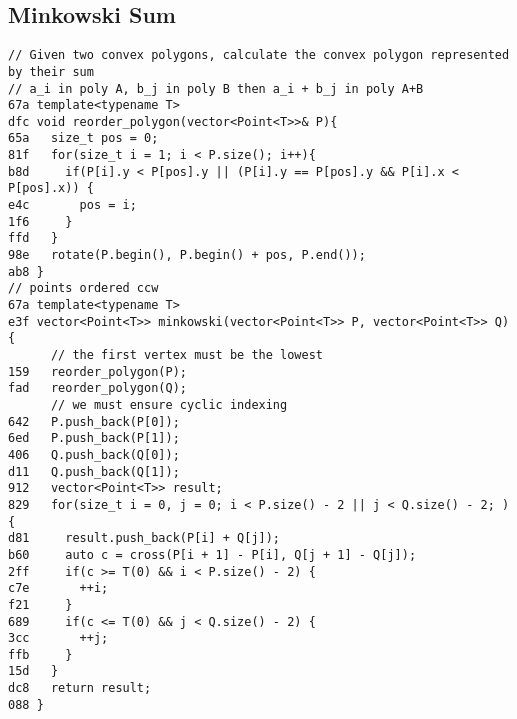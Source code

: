 \documentclass[10pt, a4paper, twoside]{article}
\begin{document}
\subsection{Minkowski Sum}
\begin{lstlisting}
// Given two convex polygons, calculate the convex polygon represented by their sum
// a_i in poly A, b_j in poly B then a_i + b_j in poly A+B
67a template<typename T>
dfc void reorder_polygon(vector<Point<T>>& P){
65a   size_t pos = 0;
81f   for(size_t i = 1; i < P.size(); i++){
b8d     if(P[i].y < P[pos].y || (P[i].y == P[pos].y && P[i].x < P[pos].x)) {
e4c       pos = i;
1f6     }
ffd   }
98e   rotate(P.begin(), P.begin() + pos, P.end());
ab8 }
// points ordered ccw
67a template<typename T>
e3f vector<Point<T>> minkowski(vector<Point<T>> P, vector<Point<T>> Q){
      // the first vertex must be the lowest
159   reorder_polygon(P);
fad   reorder_polygon(Q);
      // we must ensure cyclic indexing
642   P.push_back(P[0]);
6ed   P.push_back(P[1]);
406   Q.push_back(Q[0]);
d11   Q.push_back(Q[1]);
912   vector<Point<T>> result;
829   for(size_t i = 0, j = 0; i < P.size() - 2 || j < Q.size() - 2; ){
d81     result.push_back(P[i] + Q[j]);
b60     auto c = cross(P[i + 1] - P[i], Q[j + 1] - Q[j]);
2ff     if(c >= T(0) && i < P.size() - 2) {
c7e       ++i;
f21     }
689     if(c <= T(0) && j < Q.size() - 2) {
3cc       ++j;
ffb     }
15d   }
dc8   return result;
088 }
\end{lstlisting}
\end{document}

